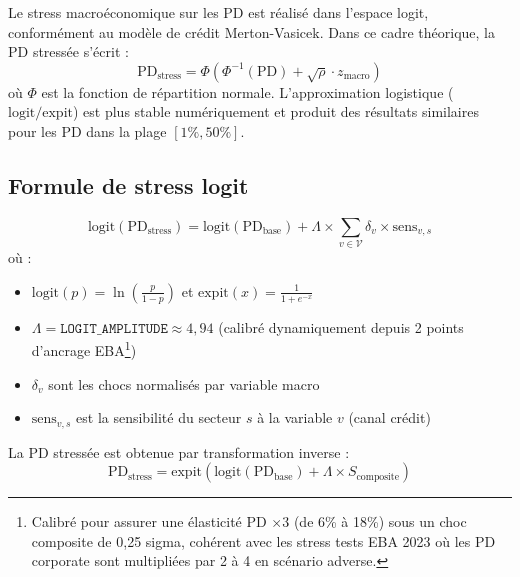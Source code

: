 \documentclass[12pt,a4paper]{article}
\begin{document}
Le stress macro\'economique sur les PD est r\'ealis\'e dans l'espace logit, conform\'ement au mod\`ele de cr\'edit Merton-Vasicek. Dans ce cadre th\'eorique, la PD stress\'ee s'\'ecrit :
\begin{equation}
\text{PD}_{\text{stress}} = \Phi\!\left(\Phi^{-1}(\text{PD}) + \sqrt{\rho} \cdot z_{\text{macro}}\right)
\end{equation}
o\`u $\Phi$ est la fonction de r\'epartition normale. L'approximation logistique ($\text{logit}/\text{expit}$) est plus stable num\'eriquement et produit des r\'esultats similaires pour les PD dans la plage $[1\%, 50\%]$.

\subsection{Formule de stress logit}

\begin{formulebox}
\begin{equation}
\label{eq:logit_stress}
\text{logit}(\text{PD}_{\text{stress}}) = \text{logit}(\text{PD}_{\text{base}}) + \Lambda \times \sum_{v \in \mathcal{V}} \delta_v \times \text{sens}_{v,s}
\end{equation}
o\`u :
\begin{itemize}
    \item $\text{logit}(p) = \ln\!\left(\frac{p}{1-p}\right)$ et $\text{expit}(x) = \frac{1}{1+e^{-x}}$
    \item $\Lambda = \texttt{LOGIT\_AMPLITUDE} \approx 4{,}94$ (calibr\'e dynamiquement depuis 2 points d'ancrage EBA\footnote{%
          Calibr\'e pour assurer une \'elasticit\'e PD $\times 3$ (de 6\% \`a 18\%) sous un choc composite
          de 0{,}25 sigma, coh\'erent avec les stress tests EBA 2023 o\`u les PD corporate sont
          multipli\'ees par 2 \`a 4 en sc\'enario adverse.})
    \item $\delta_v$ sont les chocs normalis\'es par variable macro
    \item $\text{sens}_{v,s}$ est la sensibilit\'e du secteur $s$ \`a la variable $v$ (canal cr\'edit)
\end{itemize}

La PD stress\'ee est obtenue par transformation inverse :
\begin{equation}
\text{PD}_{\text{stress}} = \text{expit}\!\left(\text{logit}(\text{PD}_{\text{base}}) + \Lambda \times S_{\text{composite}}\right)
\end{equation}
\end{formulebox}
\end{document}
